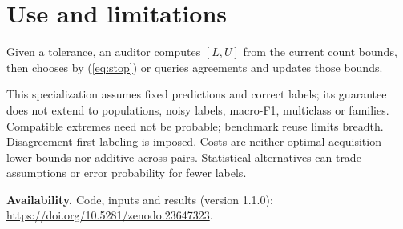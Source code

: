 \documentclass[a4paper]{esannV2}
\begin{document}
\section{Use and limitations}
Given a tolerance, an auditor computes $[L,U]$ from the current count bounds,
then chooses by (\ref{eq:stop}) or queries agreements and updates those bounds.

This specialization assumes fixed predictions and correct labels; its guarantee
does not extend to populations, noisy labels, macro-F1, multiclass or families.
Compatible extremes need not be probable; benchmark reuse limits breadth.
Disagreement-first labeling is imposed. Costs are neither optimal-acquisition
lower bounds nor additive across pairs. Statistical alternatives can trade
assumptions or error probability for fewer labels.
\par\smallskip\noindent\textbf{Availability.} Code, inputs and results (version 1.1.0):\\
\url{https://doi.org/10.5281/zenodo.23647323}.
\end{document}
